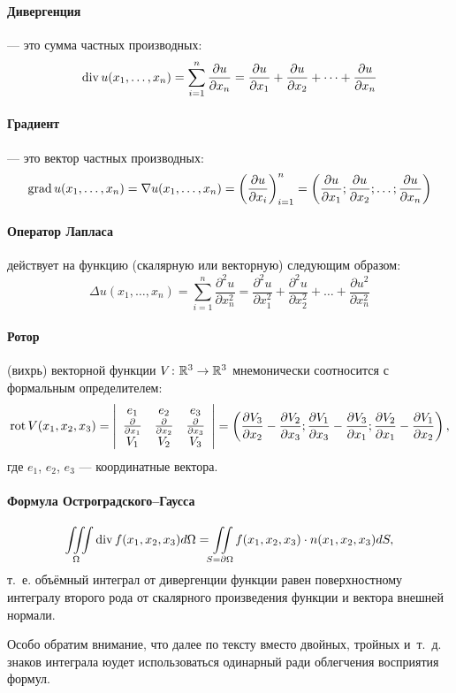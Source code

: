 \paragraph{Дивергенция}
--- это сумма частных производных:
$$
	\operatorname{div} u(x_1, \dots, x_n) =
	\sum_{i=1}^n \frac{\partial u}{\partial x_n} =
	\frac{\partial u}{\partial x_1} + \frac{\partial u}{\partial x_2} +
	\dots + \frac{\partial u}{\partial x_n}
$$

\paragraph{Градиент}
--- это вектор частных производных:
$$
	\operatorname{grad} u(x_1, \dots, x_n) =
	\nabla u(x_1, \dots, x_n) =
	\left( \frac{\partial u}{\partial x_i}\right)_{i=1}^{n} =
	\left( \frac{\partial u}{\partial x_1} ; \frac{\partial u}{\partial x_2} ;
	\dots; \frac{\partial u}{\partial x_n}\right)
$$

\paragraph{Оператор Лапласа}
действует на функцию (скалярную или векторную) следующим образом:
$$
	\Delta u(x_1, \dots, x_n) =
	\sum_{i=1}^n \frac{\partial^2 u}{\partial x_n^2} =
	\frac{\partial^2 u}{\partial x_1^2} + \frac{\partial^2 u}{\partial x_2^2} +
	\dots + \frac{\partial u^2}{\partial x_n^2}
$$

\paragraph{Ротор}
(вихрь) векторной функции
$V \colon \mathbb{R}^3 \to \mathbb{R}^3$
мнемонически соотносится с формальным определителем:
$$
	\operatorname{rot} V(x_1, x_2, x_3) =
	\left|
		\begin{array}{ccc}
			e_1                           & e_2                           & e_3 \\
			\frac{\partial}{\partial x_1} & \frac{\partial}{\partial x_2} & \frac{\partial}{\partial x_3} \\
			V_1                           & V_2                           & V_3
		\end{array}
	\right|
	=
	\left(
		\frac{\partial V_3}{\partial x_2} - \frac{\partial V_2}{\partial x_3} ;
		\frac{\partial V_1}{\partial x_3} - \frac{\partial V_3}{\partial x_1} ;
		\frac{\partial V_2}{\partial x_1} - \frac{\partial V_1}{\partial x_2}
	\right),
$$
где $e_1$, $e_2$, $e_3$ --- координатные вектора.

\paragraph{Формула Остроградского--Гаусса}
$$
	\iiint\limits_{\Omega} \operatorname{div} f(x_1, x_2, x_3) d\Omega =
	\iint\limits_{S=\partial\Omega} f(x_1, x_2, x_3) \cdot n(x_1, x_2, x_3) dS,
$$
т.~е. объёмный интеграл от дивергенции функции равен
поверхностному интегралу второго рода от скалярного произведения функции и вектора внешней нормали.

Особо обратим внимание, что далее по тексту вместо двойных, тройных и~т.~д.
знаков интеграла юудет использоваться одинарный ради облегчения восприятия формул.
